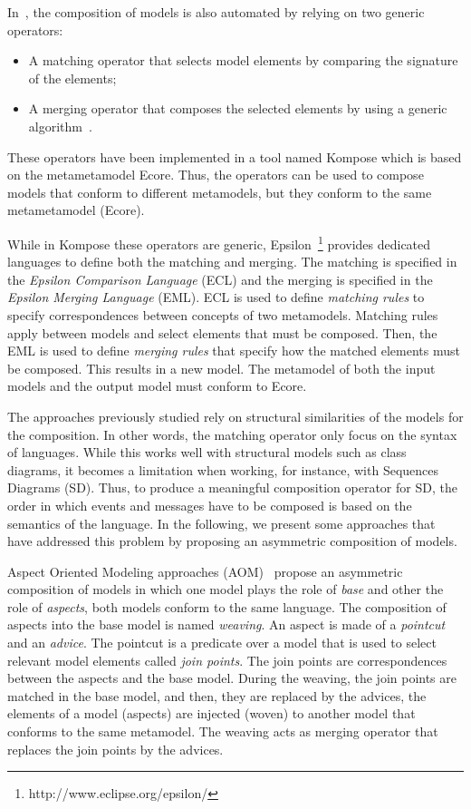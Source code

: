 In~\cite{kompose}, the composition of models is also automated by relying on two generic operators: 
	\begin{itemize}
		\item A matching operator that selects model elements by comparing the signature of the elements;
		\item A merging operator that composes the selected elements by using a generic algorithm~\cite{signaturecomposebib}.
	\end{itemize}
These operators have been implemented in a tool named Kompose which is based on the metametamodel Ecore. Thus, the operators can be used to compose models that conform to different metamodels, but they conform to the same metametamodel (\ie Ecore).

While in Kompose these operators are generic, Epsilon~\cite{epsilon}\footnote{http://www.eclipse.org/epsilon/} provides dedicated languages to define both the matching and merging. The matching is specified in the \emph{Epsilon Comparison Language} (ECL) and the merging is specified in the \emph{Epsilon Merging Language} (EML). ECL is used to define \emph{matching rules} to specify correspondences between concepts of two metamodels. Matching rules apply between models and select elements that must be composed. Then, the EML is used to define \emph{merging rules} that specify how the matched elements must be composed. This results in a new model. The metamodel of both the input models and the output model must conform to Ecore.

The approaches previously studied rely on structural similarities of the models for the composition. In other words, the matching operator only focus on the syntax of languages. While this works well with structural models such as class diagrams, it becomes a limitation when working, for instance, with Sequences Diagrams (SD). Thus, to produce a meaningful composition operator for SD, the order in which events and messages have to be composed is based on the semantics of the language. In the following, we present some approaches that have addressed this problem by proposing an asymmetric composition of models. 

Aspect Oriented Modeling approaches (AOM)~\cite{sequenceweavingbib,rambib,composdbib} propose an asymmetric composition of models in which one model plays the role of \emph{base} and other the role of \emph{aspects}, both models conform to the same language. The composition of aspects into the base model is named \emph{weaving}. An aspect is made of a \emph{pointcut} and an \emph{advice}. The pointcut is a predicate over a model that is used to select relevant model elements called \emph{join points}. The join points are correspondences between the aspects and the base model. During the weaving, the join points are matched in the base model, and then, they are replaced by the advices, \ie the elements of a model (aspects) are injected (woven) to another model that conforms to the same metamodel. The weaving acts as merging operator that replaces the join points by the advices. 

